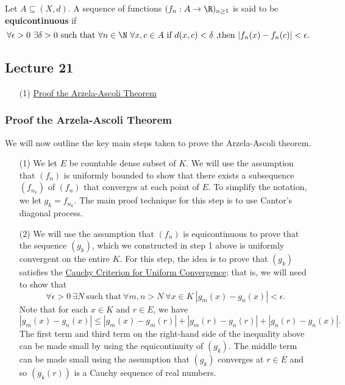 \begin{definition}\label{Equicontinuous sequence of functions}
    Let \( A \subseteq (X,d) \). A sequence of functions \( ({f}_{n} : A \to \R)_{n \geq 1} \) is said to be \textbf{equicontinuous} if 
    \[  \forall \epsilon > 0 \ \exists \delta > 0 \ \text{such that} \ \forall n \in \N \ \forall x,c \in A \ \text{if} \ d(x,c) < \delta \ \text{,then} \ | {f}_{n}(x) - {f}_{n}(c) |  < \epsilon. \]
\end{definition}


\subsection{Lecture 21}

\begin{enumerate}
    \item[(1)] {\hyperref[Proof the Arzela-Ascoli Theorem]{Proof the Arzela-Ascoli Theorem}}
\end{enumerate}


\subsubsection{Proof the Arzela-Ascoli Theorem}\label{Proof the Arzela-Ascoli Theorem}

We will now outline the key main steps taken to prove the Arzela-Ascoli theorem. 

\begin{enumerate}
\item[(1)] We let \( E  \) be countable dense subset of \( K   \). We will use the assumption that \( ({f}_{n}) \) is uniformly bounded to show that there exists a subsequence \( ({f}_{{n}_{k }}) \) of \( ({f}_{n}) \) that converges at each point of \( E  \). To simplify the notation, we let \( {g}_{k } = {f}_{{n}_{k }} \). The main proof technique for this step is to use Cantor's diagonal process. 
\item[(2)] We will use the assumption that \( ({f}_{n}) \) is equicontinuous to prove that the sequence \( ({g}_{k}) \), which we constructed in step 1 above is uniformly convergent on the entire \(  K  \). For this step, the idea is to prove that \( ({g}_{k}) \) satisfies the {\hyperref[Cauchy Criterion for Uniform Convergence]{Cauchy Criterion for Uniform Convergence}}; that is, we will need to show that 
    \[  \forall \epsilon > 0 \ \exists N \ \text{such that} \ \forall m,n > N \ \forall x \in K \ | {g}_{m}(x) - {g}_{n}(x) | < \epsilon. \]
    Note that for each \( x \in K  \) and \( r \in E  \), we have 
    \[  | {g}_{m}(x) - {g}_{n}(x) | \leq | {g}_{m}(x) - {g}_{m}(r) | + | {g}_{m}(r) - {g}_{n}(r)  |  + | {g}_{n}(r) - {g}_{n}(x) |. \]
    The first term and third term on the right-hand side of the inequality above can be made small by using the equicontinuity of \( ({g}_{k}) \). The middle term can be made small using the assumption that \( ({g}_{k}) \) converges at \( r \in E  \) and so \( ({g}_{k }(r)) \) is a Cauchy sequence of real numbers.
\end{enumerate}

